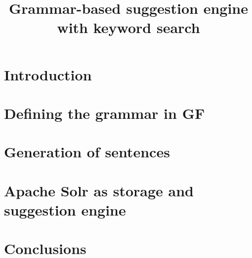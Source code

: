 \documentclass[10pt, a4paper]{article}
\title{Grammar-based suggestion engine with keyword search}
\begin{document}
\maketitleabstract

\section{Introduction}

\section{Defining the grammar in GF}

\section{Generation of sentences}

\section{Apache Solr as storage and suggestion engine}

\section{Conclusions}


\end{document}
